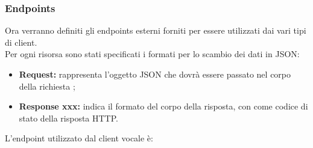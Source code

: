 \subsubsection{Endpoints}
	Ora verranno definiti gli endpoints esterni forniti per essere utilizzati dai vari tipi di client.\\
	Per ogni risorsa sono stati specificati i formati per lo scambio dei dati in JSON:
	\begin{itemize}
		\item \textbf{Request:} rappresenta l’oggetto JSON che dovrà essere passato nel corpo della richiesta ;
		\item \textbf{Response xxx:} indica il formato del corpo della risposta, con  come codice di stato della risposta HTTP.
	\end{itemize}
	L'endpoint utilizzato dal client vocale è:

